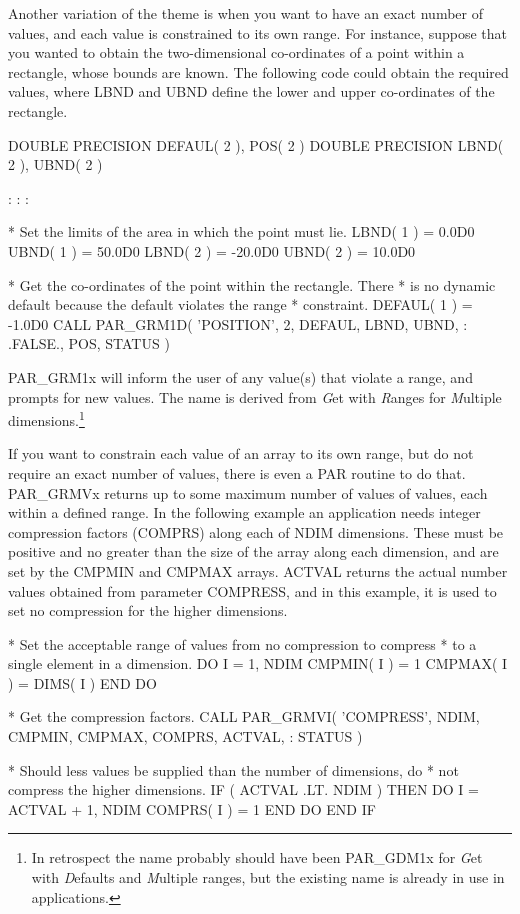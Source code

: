 \documentclass[twoside,11pt,nolof]{starlink}
\begin{document}
Another variation of the theme is when you want to have an exact number
of values, and each value is constrained to its own range.
For instance, suppose that you wanted to obtain the
two-dimensional co-ordinates of a point within a rectangle, whose bounds
are known.  The following code could obtain the required values, where
LBND and UBND define the lower and upper co-ordinates of the rectangle.

\begin{terminalv}
      DOUBLE PRECISION DEFAUL( 2 ), POS( 2 )
      DOUBLE PRECISION LBND( 2 ), UBND( 2 )

          :       :       :

*  Set the limits of the area in which the point must lie.
      LBND( 1 ) = 0.0D0
      UBND( 1 ) = 50.0D0
      LBND( 2 ) = -20.0D0
      UBND( 2 ) = 10.0D0

*  Get the co-ordinates of the point within the rectangle.  There
*  is no dynamic default because the default violates the range
*  constraint.
      DEFAUL( 1 ) = -1.0D0
      CALL PAR_GRM1D( 'POSITION', 2, DEFAUL, LBND, UBND,
     :                .FALSE., POS, STATUS )
\end{terminalv}

PAR\_GRM1x will inform the user of any value(s) that violate a range,
and prompts for new values.  The name is derived from \emph{G\/}et with
\emph{R\/}anges for \emph{M\/}ultiple dimensions.\footnote{In retrospect
the name probably should have been PAR\_GDM1x for \emph{G\/}et with
\emph{D\/}efaults and \emph{M\/}ultiple ranges, but the existing name is
already in use in applications.}

If you want to constrain each value of an array to its own range, but do
not require an exact number of values, there is even a PAR routine to do
that.  PAR\_GRMVx returns up to some maximum number of values of values,
each within a defined range.  In the following example an application
needs integer compression factors (COMPRS) along each of NDIM
dimensions.  These must be positive and no greater than the size of the
array along each dimension, and are set by the CMPMIN and CMPMAX arrays.
ACTVAL returns the actual number values obtained from parameter
COMPRESS, and in this example, it is used to set no compression for the
higher dimensions.

\begin{terminalv}
*  Set the acceptable range of values from no compression to compress
*  to a single element in a dimension.
      DO I = 1, NDIM
         CMPMIN( I ) = 1
         CMPMAX( I ) = DIMS( I )
      END DO

*  Get the compression factors.
      CALL PAR_GRMVI( 'COMPRESS', NDIM, CMPMIN, CMPMAX, COMPRS, ACTVAL,
     :                STATUS )

*  Should less values be supplied than the number of dimensions, do
*  not compress the higher dimensions.
      IF ( ACTVAL .LT. NDIM ) THEN
         DO I = ACTVAL + 1, NDIM
            COMPRS( I ) = 1
         END DO
      END IF
\end{terminalv}
\end{document}
